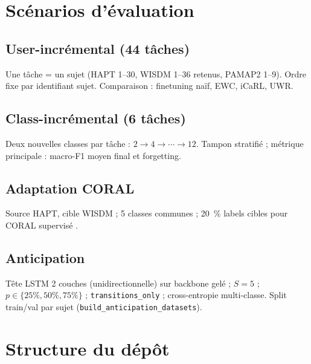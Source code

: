 \documentclass[a4paper,12pt]{report}
\begin{document}
\section{Scénarios d'évaluation}

\subsection{User-incrémental (44 tâches)}

Une tâche = un sujet (HAPT 1--30, WISDM 1--36 retenus, PAMAP2 1--9).
Ordre fixe par identifiant sujet. Comparaison : finetuning naïf, EWC, iCaRL, UWR.

\subsection{Class-incrémental (6 tâches)}

Deux nouvelles classes par tâche : $2 \rightarrow 4 \rightarrow \cdots \rightarrow 12$.
Tampon stratifié ; métrique principale : macro-F1 moyen final et forgetting.

\subsection{Adaptation CORAL}

Source HAPT, cible WISDM ; 5 classes communes ; 20~\% labels cibles pour CORAL
supervisé \parencite{sun2016}.

\subsection{Anticipation}

Tête LSTM 2 couches (unidirectionnelle) sur backbone gelé ; $S=5$ ;
$p \in \{25\%, 50\%, 75\%\}$ ; \texttt{transitions\_only} ; cross-entropie
multi-classe. Split train/val par sujet
(\texttt{build\_anticipation\_datasets}).

\section{Structure du dépôt}
\end{document}
